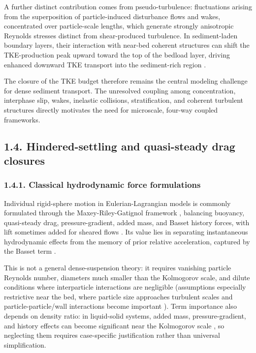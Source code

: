 A further distinct contribution comes from pseudo-turbulence: fluctuations arising from the superposition of particle-induced disturbance flows and wakes, concentrated over particle-scale lengths, which generate strongly anisotropic Reynolds stresses distinct from shear-produced turbulence. In sediment-laden boundary layers, their interaction with near-bed coherent structures can shift the TKE-production peak upward toward the top of the bedload layer, driving enhanced downward TKE transport into the sediment-rich region \cite{brandt__2022,guta__2024,moore__2019}.

The closure of the TKE budget therefore remains the central modeling challenge for dense sediment transport. The unresolved coupling among concentration, interphase slip, wakes, inelastic collisions, stratification, and coherent turbulent structures directly motivates the need for microscale, four-way coupled frameworks.

\subsection{1.4. Hindered-settling and quasi-steady drag closures}

\subsubsection{1.4.1. Classical hydrodynamic force formulations}

Individual rigid-sphere motion in Eulerian-Lagrangian models is commonly formulated through the Maxey-Riley-Gatignol framework \cite{PEND_Gatignol1983,maxey__1983}, balancing buoyancy, quasi-steady drag, pressure-gradient, added mass, and Basset history forces, with lift sometimes added for sheared flows \cite{balachandar__2010,brandt__2022}. Its value lies in separating instantaneous hydrodynamic effects from the memory of prior relative acceleration, captured by the Basset term \cite{PEND_Crowe2012,PEND_Prosperetti2007}.

This is not a general dense-suspension theory: it requires vanishing particle Reynolds number, diameters much smaller than the Kolmogorov scale, and dilute conditions where interparticle interactions are negligible \cite{balachandar__2010,elghobashi__1994,kuerten__2016} (assumptions especially restrictive near the bed, where particle size approaches turbulent scales and particle-particle/wall interactions become important \cite{messa__2021,PEND_Shao2012}). Term importance also depends on density ratio: in liquid-solid systems, added mass, pressure-gradient, and history effects can become significant near the Kolmogorov scale \cite{kuerten__2016,PEND_Rupp2023}, so neglecting them requires case-specific justification rather than universal simplification.

